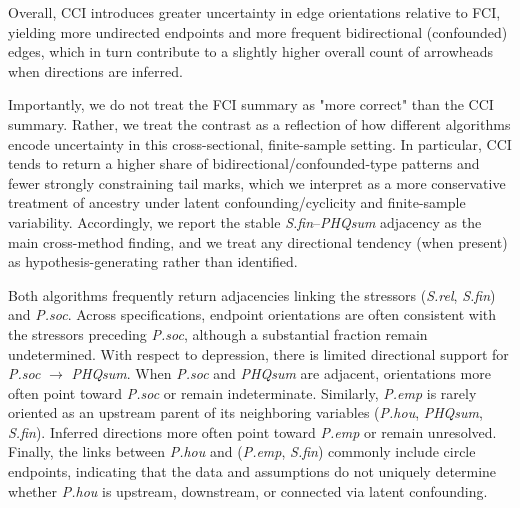 \documentclass[
]{article}
\begin{document}
Overall, CCI introduces greater uncertainty in edge orientations
relative to FCI, yielding more undirected endpoints and more frequent
bidirectional (confounded) edges, which in turn contribute to a slightly
higher overall count of arrowheads when directions are inferred.

\textcolor{BrickRed}{Importantly, we do not treat the FCI summary as "more correct" than the CCI summary. Rather, we treat the contrast as a reflection of how different algorithms encode uncertainty in this cross-sectional, finite-sample setting. In particular, CCI tends to return a higher share of bidirectional/confounded-type patterns and fewer strongly constraining tail marks, which we interpret as a more conservative treatment of ancestry under latent confounding/cyclicity and finite-sample variability. Accordingly, we report the stable \textit{S.fin}–\textit{PHQsum} adjacency as the main cross-method finding, and we treat any directional tendency (when present) as hypothesis-generating rather than identified.}

\textcolor{BrickRed}{Both algorithms frequently return adjacencies linking the stressors (\textit{S.rel}, \textit{S.fin}) and \textit{P.soc}. Across specifications, endpoint orientations are often consistent with the stressors preceding \textit{P.soc}, although a substantial fraction remain undetermined. With respect to depression, there is limited directional support for \textit{P.soc} $\rightarrow$ \textit{PHQsum}. When \textit{P.soc} and \textit{PHQsum} are adjacent, orientations more often point toward \textit{P.soc} or remain indeterminate. Similarly, \textit{P.emp} is rarely oriented as an upstream parent of its neighboring variables (\textit{P.hou}, \textit{PHQsum}, \textit{S.fin}). Inferred directions more often point toward \textit{P.emp} or remain unresolved. Finally, the links between \textit{P.hou} and (\textit{P.emp}, \textit{S.fin}) commonly include circle endpoints, indicating that the data and assumptions do not uniquely determine whether \textit{P.hou} is upstream, downstream, or connected via latent confounding.}
\end{document}
